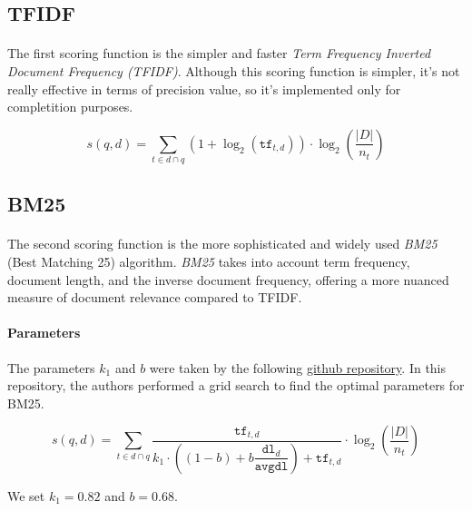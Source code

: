 \subsection{TFIDF}

\paragraph{}
The first scoring function is the simpler and faster \textit{Term Frequency Inverted Document Frequency (TFIDF)}.
Although this scoring function is simpler, it's not really effective in terms of precision value, so it's implemented only for completition
purposes.

\begin{equation}
	s(q,d) = \sum_{t \in d \cap q}\left(1 + \log_2(\mathtt{tf}_{t,d})\right) \cdot \log_2\left(\dfrac{|D|}{n_t}\right)
\end{equation}

\subsection{BM25}

\paragraph{}
The second scoring function is the more sophisticated and widely used \textit{BM25} (Best Matching 25) algorithm. 
\textit{BM25} takes into account term frequency, document length, and the inverse document frequency, offering a more nuanced measure of 
document relevance compared to TFIDF.

\paragraph{Parameters}
The parameters $k_1$ and $b$ were taken by the following 
\href{https://github.com/castorini/pyserini/blob/master/docs/experiments-msmarco-passage.md}{github repository}. 
In this repository, the authors performed a grid search to find the optimal parameters for BM25.

\begin{equation}
	s(q,d) = 
	\sum_{t \in d \cap q}
	\dfrac{\mathtt{tf}_{t,d}}{
		k_1 \cdot \left( (1 - b) + b \dfrac{\mathtt{dl}_d}{\mathtt{avgdl}}
		\right) + \mathtt{tf}_{t,d}
	}
	\cdot \log_2\left(\dfrac{|D|}{n_t}\right)
\end{equation}

We set $k_1 = 0.82$ and $b = 0.68$.


